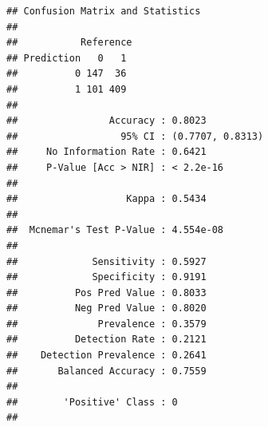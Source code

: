 \documentclass[
]{article}
\newenvironment{Shaded}{\begin{snugshade}}{\end{snugshade}}
\newcommand{\AttributeTok}[1]{\textcolor[rgb]{0.13,0.29,0.53}{#1}}
\newcommand{\DecValTok}[1]{\textcolor[rgb]{0.00,0.00,0.81}{#1}}
\newcommand{\FloatTok}[1]{\textcolor[rgb]{0.00,0.00,0.81}{#1}}
\newcommand{\FunctionTok}[1]{\textcolor[rgb]{0.13,0.29,0.53}{\textbf{#1}}}
\newcommand{\NormalTok}[1]{#1}
\newcommand{\OtherTok}[1]{\textcolor[rgb]{0.56,0.35,0.01}{#1}}
\newcommand{\SpecialCharTok}[1]{\textcolor[rgb]{0.81,0.36,0.00}{\textbf{#1}}}
\newcommand{\StringTok}[1]{\textcolor[rgb]{0.31,0.60,0.02}{#1}}
\begin{document}
\begin{Shaded}
\end{Shaded}

\begin{verbatim}
## Confusion Matrix and Statistics
## 
##           Reference
## Prediction   0   1
##          0 147  36
##          1 101 409
##                                           
##                Accuracy : 0.8023          
##                  95% CI : (0.7707, 0.8313)
##     No Information Rate : 0.6421          
##     P-Value [Acc > NIR] : < 2.2e-16       
##                                           
##                   Kappa : 0.5434          
##                                           
##  Mcnemar's Test P-Value : 4.554e-08       
##                                           
##             Sensitivity : 0.5927          
##             Specificity : 0.9191          
##          Pos Pred Value : 0.8033          
##          Neg Pred Value : 0.8020          
##              Prevalence : 0.3579          
##          Detection Rate : 0.2121          
##    Detection Prevalence : 0.2641          
##       Balanced Accuracy : 0.7559          
##                                           
##        'Positive' Class : 0               
## 
\end{verbatim}
\end{document}
